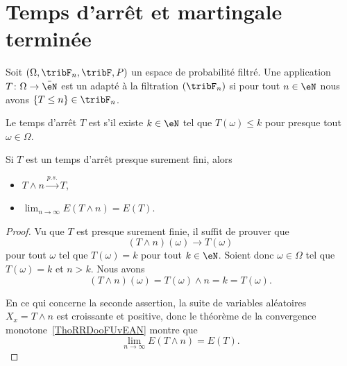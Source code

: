 \section{Temps d'arrêt et martingale terminée}

\begin{definition}
    Soit \( (\Omega,\tribF_n,\tribF,P)\) un espace de probabilité filtré. Une application \( T\colon \Omega\to \bar \eN\) est un  adapté à la filtration \( (\tribF_n)\) si pour tout \( n\in \eN\) nous avons \( \{ T\leq n \}\in\tribF_n\).

    Le temps d'arrêt $T$ est  s'il existe \( k\in \eN\) tel que \( T(\omega)\leq k\) pour presque tout \( \omega\in \Omega\).
\end{definition}

\begin{lemma} \label{LemXYeCLXW}
    Si \( T\) est un temps d'arrêt presque surement fini, alors
    \begin{itemize}
        \item \( T\wedge n\stackrel{p.s.}{\longrightarrow}T\),
        \item   \label{ItemIPPkxmAii}
            \( \lim_{n\to \infty}  E(T\wedge n)=E(T)\).
    \end{itemize}
\end{lemma}

\begin{proof}
    Vu que \( T \) est presque surement finie, il suffit de prouver que
    \begin{equation}    \label{EqRVoKxsN}
        (T\wedge n)(\omega)\to T(\omega)
    \end{equation}
    pour tout \( \omega\) tel que \( T(\omega)=k\) pour tout \( k\in \eN\). Soient donc \( \omega\in \Omega\) tel que \( T(\omega)=k\) et \( n>k\). Nous avons
    \begin{equation}
        (T\wedge n)(\omega)=T(\omega)\wedge n=k=T(\omega).
    \end{equation}

    En ce qui concerne la seconde assertion, la suite de variables aléatoires \( X_x=T\wedge n\) est croissante et positive, donc le théorème de la convergence monotone~\ref{ThoRRDooFUvEAN} montre que
    \begin{equation}
        \lim_{n\to \infty}E(T\wedge n)=E(T).
    \end{equation}
\end{proof}

